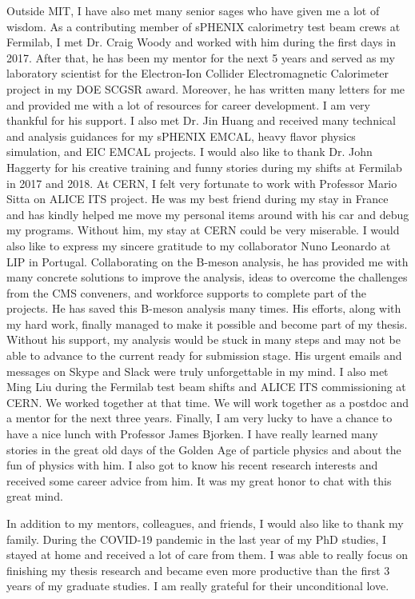 Outside MIT, I have also met many senior sages who have given me a lot of wisdom. As a contributing member of sPHENIX calorimetry test beam crews at Fermilab, I met Dr. Craig Woody and worked with him during the first days in 2017. After that, he has been my mentor for the next 5 years and served as my laboratory scientist for the Electron-Ion Collider Electromagnetic Calorimeter project in my DOE SCGSR award. Moreover, he has written many letters for me and provided me with a lot of resources for career development. I am very thankful for his support. I also met Dr. Jin Huang and received many technical and analysis guidances for my sPHENIX EMCAL, heavy flavor physics simulation, and EIC EMCAL projects. I would also like to thank Dr. John Haggerty for his creative training and funny stories during my shifts at Fermilab in 2017 and 2018. At CERN, I felt very fortunate to work with Professor Mario Sitta on ALICE ITS project. He was my best friend during my stay in France and has kindly helped me move my personal items around with his car and debug my programs. Without him, my stay at CERN could be very miserable. I would also like to express my sincere gratitude to my collaborator Nuno Leonardo at LIP in Portugal. Collaborating on the B-meson analysis, he has provided me with many concrete solutions to improve the analysis, ideas to overcome the challenges from the CMS conveners, and workforce supports to complete part of the projects. He has saved this B-meson analysis many times. His efforts, along with my hard work, finally managed to make it possible and become part of my thesis. Without his support, my analysis would be stuck in many steps and may not be able to advance to the current ready for submission stage. His urgent emails and messages on Skype and Slack were truly unforgettable in my mind. I also met Ming Liu during the Fermilab test beam shifts and ALICE ITS commissioning at CERN. We worked together at that time. We will work together as a postdoc and a mentor for the next three years. Finally, I am very lucky to have a chance to have a nice lunch with Professor James Bjorken. I have really learned many stories in the great old days of the Golden Age of particle physics and about the fun of physics with him. I also got to know his recent research interests and received some career advice from him. It was my great honor to chat with this great mind.

In addition to my mentors, colleagues, and friends, I would also like to thank my family. During the COVID-19 pandemic in the last year of my PhD studies, I stayed at home and received a lot of care from them. I was able to really focus on finishing my thesis research and became even more productive than the first 3 years of my graduate studies. I am really grateful for their unconditional love. 

